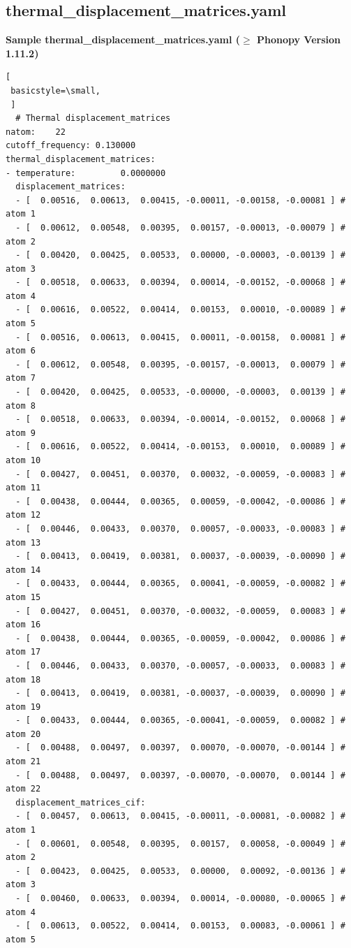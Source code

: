 \documentclass[12pt,a4paper]{article}
\begin{document}
 \subsection{thermal\_displacement\_matrices.yaml}\label{thermal}
   \textbf{Sample thermal\_displacement\_matrices.yaml ($\mathbf{\geq}$ Phonopy Version 1.11.2)}
 \begin{lstlisting}[
 basicstyle=\small,
 ]
  # Thermal displacement_matrices
natom:    22
cutoff_frequency: 0.130000
thermal_displacement_matrices:
- temperature:         0.0000000
  displacement_matrices:
  - [  0.00516,  0.00613,  0.00415, -0.00011, -0.00158, -0.00081 ] # atom 1
  - [  0.00612,  0.00548,  0.00395,  0.00157, -0.00013, -0.00079 ] # atom 2
  - [  0.00420,  0.00425,  0.00533,  0.00000, -0.00003, -0.00139 ] # atom 3
  - [  0.00518,  0.00633,  0.00394,  0.00014, -0.00152, -0.00068 ] # atom 4
  - [  0.00616,  0.00522,  0.00414,  0.00153,  0.00010, -0.00089 ] # atom 5
  - [  0.00516,  0.00613,  0.00415,  0.00011, -0.00158,  0.00081 ] # atom 6
  - [  0.00612,  0.00548,  0.00395, -0.00157, -0.00013,  0.00079 ] # atom 7
  - [  0.00420,  0.00425,  0.00533, -0.00000, -0.00003,  0.00139 ] # atom 8
  - [  0.00518,  0.00633,  0.00394, -0.00014, -0.00152,  0.00068 ] # atom 9
  - [  0.00616,  0.00522,  0.00414, -0.00153,  0.00010,  0.00089 ] # atom 10
  - [  0.00427,  0.00451,  0.00370,  0.00032, -0.00059, -0.00083 ] # atom 11
  - [  0.00438,  0.00444,  0.00365,  0.00059, -0.00042, -0.00086 ] # atom 12
  - [  0.00446,  0.00433,  0.00370,  0.00057, -0.00033, -0.00083 ] # atom 13
  - [  0.00413,  0.00419,  0.00381,  0.00037, -0.00039, -0.00090 ] # atom 14
  - [  0.00433,  0.00444,  0.00365,  0.00041, -0.00059, -0.00082 ] # atom 15
  - [  0.00427,  0.00451,  0.00370, -0.00032, -0.00059,  0.00083 ] # atom 16
  - [  0.00438,  0.00444,  0.00365, -0.00059, -0.00042,  0.00086 ] # atom 17
  - [  0.00446,  0.00433,  0.00370, -0.00057, -0.00033,  0.00083 ] # atom 18
  - [  0.00413,  0.00419,  0.00381, -0.00037, -0.00039,  0.00090 ] # atom 19
  - [  0.00433,  0.00444,  0.00365, -0.00041, -0.00059,  0.00082 ] # atom 20
  - [  0.00488,  0.00497,  0.00397,  0.00070, -0.00070, -0.00144 ] # atom 21
  - [  0.00488,  0.00497,  0.00397, -0.00070, -0.00070,  0.00144 ] # atom 22
  displacement_matrices_cif:
  - [  0.00457,  0.00613,  0.00415, -0.00011, -0.00081, -0.00082 ] # atom 1
  - [  0.00601,  0.00548,  0.00395,  0.00157,  0.00058, -0.00049 ] # atom 2
  - [  0.00423,  0.00425,  0.00533,  0.00000,  0.00092, -0.00136 ] # atom 3
  - [  0.00460,  0.00633,  0.00394,  0.00014, -0.00080, -0.00065 ] # atom 4
  - [  0.00613,  0.00522,  0.00414,  0.00153,  0.00083, -0.00061 ] # atom 5

\end{lstlisting}
\end{document}
